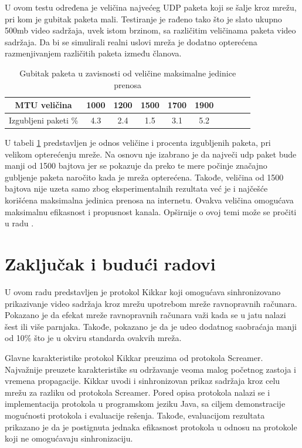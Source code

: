\documentclass[12pt,oneside]{memoir}
\begin{document}
U ovom testu određena je veličina najvećeg UDP paketa koji se šalje kroz mrežu, pri kom je gubitak paketa mali. Testiranje je rađeno tako što je slato ukupno 500mb video sadržaja, uvek istom brzinom, sa različitim veličinama paketa video sadržaja. Da bi se simulirali realni uslovi mreža je dodatno opterećena razmenjivanjem različitih paketa između članova. 

\begin{table}[h]
\caption{Gubitak paketa u zavisnosti od veličine maksimalne jedinice prenosa} 
\label{tab:mtu}
\centering
\begin{tabular}{ |c|c|c|c|c|c|c|c|c|c| } 
\hline 
 MTU veličina & 1000 & 1200 & 1500 & 1700 & 1900\\
\hline
 Izgubljeni paketi \% & 4.3 & 2.4 & 1.5 & 3.1 & 5.2  \\
\hline
\end{tabular}
\end{table} 

U tabeli \ref{tab:mtu} predstavljen je odnos veličine i procenta izgubljenih paketa, pri velikom opterećenju mreže. Na osnovu nje izabrano je da največi udp paket bude manji od 1500 bajtova jer se pokazuje da preko te mere počinje značajno gubljenje paketa naročito kada je mreža opterećena. Takođe, veličina od 1500 bajtova nije uzeta samo zbog eksperimentalnih rezultata već je i najčešće korišćena maksimalna jedinica prenosa na internetu. Ovakva veličina omogućava maksimalnu efikasnost i propusnost kanala. Opširnije o ovoj temi može se pročiti u radu \cite{Kodikara} .




\chapter{Zaključak i budući radovi}
\label{chp:zakljucak}

U ovom radu predstavljen je protokol Kikkar koji omogućava sinhronizovano prikazivanje video sadržaja kroz mrežu upotrebom mreže ravnopravnih računara. Pokazano je da efekat mreže ravnopravnih računara važi kada se u jatu nalazi šest ili više parnjaka. Takođe, pokazano je da je udeo dodatnog saobraćaja manji od 10\% što je u okviru standarda ovakvih mreža.
 
Glavne karakteristike protokol Kikkar preuzima od protokola Screamer. Najvažnije preuzete karakteristike su održavanje veoma malog početnog zastoja i vremena propagacije. Kikkar uvodi i sinhronizovan prikaz sadržaja kroz celu mrežu za razliku od protokola Screamer. Pored opisa protokola nalazi se i implementacija protokola u programskom jeziku Java, sa ciljem demonstracije mogućnosti protokola i evaluacije rešenja. Takođe, evaluacijom rezultata prikazano je da je postignuta jednaka efikasnost protokola u odnosu na protokole koji ne omogućavaju sinhronizaciju. 
\end{document}
